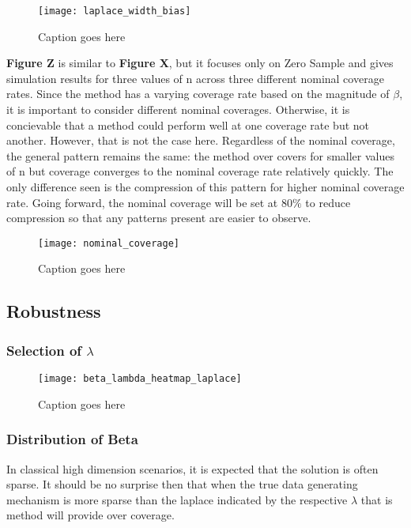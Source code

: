 \begin{figure}
  \texttt{[image: laplace\_width\_bias]}
  \caption{\label{Fig:laplace_width_bias} Caption goes here}
\end{figure}

\textbf{Figure Z} is similar to \textbf{Figure X}, but it focuses only on Zero Sample and gives simulation results for three values of n across three different nominal coverage rates. Since the method has a varying coverage rate based on the magnitude of $\beta$, it is important to consider different nominal coverages. Otherwise, it is concievable that a method could perform well at one coverage rate but not another. However, that is not the case here. Regardless of the nominal coverage, the general pattern remains the same: the method over covers for smaller values of n but coverage converges to the nominal coverage rate relatively quickly. The only difference seen is the compression of this pattern for higher nominal coverage rate. Going forward, the nominal coverage will be set at $80\%$ to reduce compression so that any patterns present are easier to observe.


\begin{figure}
  \texttt{[image: nominal\_coverage]}
  \caption{\label{Fig:nominal_coverage} Caption goes here}
\end{figure}

\subsection{Robustness}

\subsubsection{Selection of \texorpdfstring{$\lambda$}{lambda}}


\begin{figure}
  \texttt{[image: beta\_lambda\_heatmap\_laplace]}
  \caption{\label{Fig:beta_lambda_heatmap_laplace} Caption goes here}
\end{figure}

\subsubsection{Distribution of Beta}

In classical high dimension scenarios, it is expected that the solution is often sparse. It should be no surprise then that when the true data generating mechanism is more sparse than the laplace indicated by the respective $\lambda$ that is method will provide over coverage.


